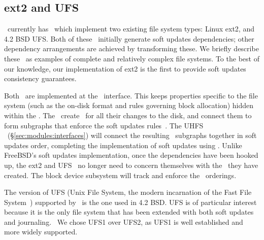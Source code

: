 \begin{comment}
An example configuration taking advantage of this ability could be a file
system image mounted with an external journal, both of which are loopback block
devices stored on the root file system (which could use soft updates). The
journaled file system's ordering requirements are sent through the loopback
device as \chdescs, allowing dependency information to be maintained across
boundaries that might otherwise lose that information. In contrast, without
\chdescs\ and the ability to forward \chdescs\ through loopback devices, BSD
cannot express soft updates' consistency requirements through loopback devices.
Although the use of a loopback device is somewhat contrived in the example,
they are increasingly being used in conventional operating systems. For
instance, Mac OS X uses them in order to allow users to encrypt their home
directories.
\end{comment}

\subsection{ext2 and UFS}

\Kudos\ currently has \modules\ which implement two existing file system types:
Linux ext2, and 4.2 BSD UFS. Both of these \modules\ initially generate soft
updates dependencies; other dependency arrangements are achieved by
transforming these. We briefly describe these \modules\ as examples of complete
and relatively complex file systems. To the best of our knowledge, our
implementation of ext2 is the first to provide soft updates consistency
guarantees.

Both \modules\ are implemented at the \LFS\ interface. This keeps properties
specific to the file system (such as the on-disk format and rules governing
block allocation) hidden within the \module. The \modules\ create \chdescs\ for
all their changes to the disk, and connect them to form subgraphs that enforce
the soft updates rules~\cite{ganger00soft}. The UHFS \module\
(\S\ref{sec:modules:interfaces}) will connect the resulting \chdesc\ subgraphs
together in soft updates order, completing the implementation of soft updates
using \chdescs. Unlike FreeBSD's soft updates implementation, once the
dependencies have been hooked up, the ext2 and UFS \modules\ no longer need to
concern themselves with the \chdescs\ they have created. The block device
subsystem will track and enforce the \chdesc\ orderings.

The version of UFS (Unix File System, the modern incarnation of the Fast File
System~\cite{mckusick84fast}) supported by \Kudos\ is the one used in 4.2 BSD.
UFS is of particular interest because it is the only file system that has been
extended with both soft updates and journaling.~\cite{seltzer00journaling} We
chose UFS1 over UFS2, as UFS1 is well established and more widely supported.

